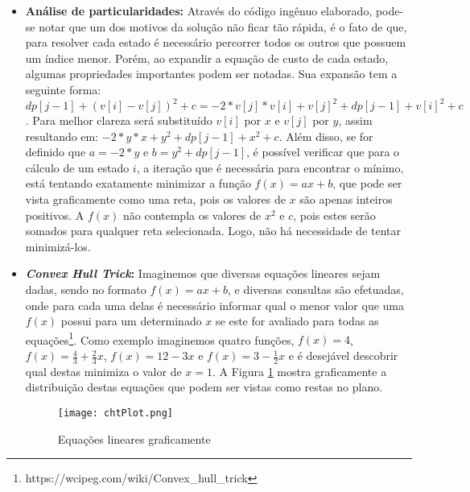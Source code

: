 \begin{itemize}[leftmargin=-.001in]
\item \textbf{Análise de particularidades:}
Através do código ingênuo elaborado, pode-se notar que um dos motivos da solução não ficar tão rápida, é o fato de que, para resolver cada estado é necessário percorrer todos os outros que possuem um índice menor. Porém, ao expandir a equação de custo de cada estado, algumas propriedades importantes podem ser notadas. Sua expansão tem a seguinte forma:
$dp[j-1] + (v[i] - v[j])^2 + c = -2*v[j]*v[i] + v[j]^2 + dp[j-1] + v[i]^2 + c$. Para melhor clareza será substituído $v[i]$ por $x$ e $v[j]$ por $y$, assim resultando em:
$-2*y*x + y^2 + dp[j-1] + x^2 + c$. Além disso, se for definido que $a = -2*y$ e $b = y^2 + dp[j-1]$, é possível verificar que para o cálculo de um estado $i$, a iteração que é necessária para encontrar o mínimo, está tentando exatamente minimizar a função $f(x) = ax + b$, que pode ser vista graficamente como uma reta, pois os valores de $x$ são apenas inteiros positivos. A $f(x)$ não contempla os valores de $x^2$ e $c$, pois estes serão somados para qualquer reta selecionada. Logo, não há necessidade de tentar minimizá-los.

\item \textbf{\textit{Convex Hull Trick}:}
Imaginemos que diversas equações lineares sejam dadas, sendo no formato $f(x) = ax + b$, e diversas consultas são efetuadas, onde para cada uma delas é necessário informar qual o menor valor que uma $f(x)$ possui para um determinado $x$ se este for avaliado para todas as equações\footnote{https://wcipeg.com/wiki/Convex\_hull\_trick}. 
Como exemplo imaginemos quatro funções, $f(x) = 4$, $f(x) = \frac{4}{3} + \frac{2}{3}x$, $f(x) = 12 - 3x$ e $f(x) = 3 - \frac{1}{2}x$ e é desejável descobrir qual destas minimiza o valor de $x = 1$. A Figura \ref{fig:chtplot} mostra graficamente a distribuição destas equações que podem ser vistas como restas no plano.

\begin{figure}[H]
	\centering
	\caption[Equações lineares graficamente]{Equações lineares graficamente}
	\texttt{[image: chtPlot.png]} %
	\label{fig:chtplot}
\end{figure}


\end{itemize}
